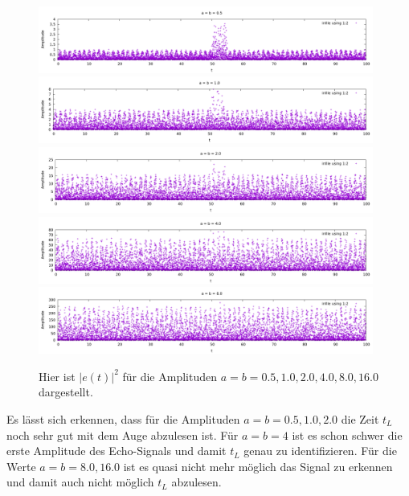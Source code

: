 \documentclass[ngerman]{scrartcl}
\begin{document}
\begin{figure}[htbp]
	\centering
	\includegraphics[width=0.98\textwidth]{plots/echo/0.5}
	\includegraphics[width=0.98\textwidth]{plots/echo/1.0}
	\includegraphics[width=0.98\textwidth]{plots/echo/2.0}
	\includegraphics[width=0.98\textwidth]{plots/echo/4.0}
	\includegraphics[width=0.98\textwidth]{plots/echo/8.0}
	\caption[$|e(t)|^2$]{Hier ist $|e(t)|^2$ für die Amplituden $a=b=0.5, 1.0, 2.0, 4.0, 8.0, 16.0$ dargestellt.}
	\label{fig:2.1}
\end{figure} 


Es lässt sich erkennen, dass für die Amplituden $a=b=0.5, 1.0, 2.0$ die Zeit $t_L$ noch sehr gut mit dem Auge abzulesen ist. Für $a=b=4$ ist es schon schwer die erste Amplitude des Echo-Signals und damit $t_L$ genau zu identifizieren. Für die Werte $a=b=8.0, 16.0$ ist es quasi nicht mehr möglich das Signal zu erkennen und damit auch nicht möglich $t_L$ abzulesen. 




\subsection{}
\end{document}
